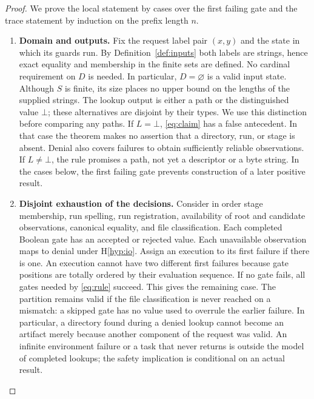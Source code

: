 \documentclass[12pt]{article}
\newcommand{\denied}{\bot}
\begin{document}
\begin{proof}
We prove the local statement by cases over the first failing gate and
the trace statement by induction on the prefix length $n$.

\begin{enumerate}
\item \textbf{Domain and outputs.}
Fix the request label pair $(x,y)$ and the state in which its guards
run. By Definition~\ref{def:inputs} both labels are strings, hence exact
equality and membership in the finite sets are defined. No cardinal
requirement on $D$ is needed. In particular, $D=\varnothing$ is a valid
input state. Although $S$ is finite, its size places no upper bound on
the lengths of the supplied strings. The lookup output is either a
path or the distinguished value $\denied$; these alternatives are
disjoint by their types. We use this distinction before comparing any
paths. If $L=\denied$, \eqref{eq:claim} has a false antecedent.
In that case the theorem makes no assertion that a directory, run,
or stage is absent. Denial also covers failures to obtain sufficiently
reliable observations. If $L\ne\denied$, the rule promises a path,
not yet a descriptor or a byte string. In the cases below, the
first failing gate prevents construction of a later positive result.

\item \textbf{Disjoint exhaustion of the decisions.}
Consider in order stage membership, run spelling, run registration,
availability of root and candidate observations, canonical equality,
and file classification. Each completed Boolean gate has an accepted
or rejected value. Each unavailable observation maps to denial under
H\ref{hyp:io}. Assign an execution to its first failure if there is
one. An execution cannot have two different first failures because
gate positions are totally ordered by their evaluation sequence.
If no gate fails, all gates needed by \eqref{eq:rule} succeed. This
gives the remaining case. The partition remains valid if the file
classification is never reached on a mismatch: a skipped gate has no
value used to overrule the earlier failure. In particular, a directory
found during a denied lookup cannot become an artifact merely because
another component of the request was valid. An infinite environment
failure or a task that never returns is outside the model of completed
lookups; the safety implication is conditional on an actual result.


\end{enumerate}
\end{proof}
\end{document}
